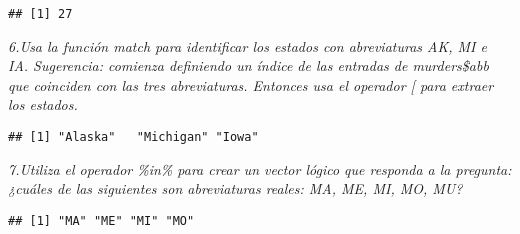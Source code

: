 \documentclass[
]{article}
\newenvironment{Shaded}{\begin{snugshade}}{\end{snugshade}}
\newcommand{\CommentTok}[1]{\textcolor[rgb]{0.56,0.35,0.01}{\textit{#1}}}
\newcommand{\FunctionTok}[1]{\textcolor[rgb]{0.00,0.00,0.00}{#1}}
\newcommand{\NormalTok}[1]{#1}
\newcommand{\OtherTok}[1]{\textcolor[rgb]{0.56,0.35,0.01}{#1}}
\newcommand{\SpecialCharTok}[1]{\textcolor[rgb]{0.00,0.00,0.00}{#1}}
\newcommand{\StringTok}[1]{\textcolor[rgb]{0.31,0.60,0.02}{#1}}
\begin{document}
\begin{verbatim}
## [1] 27
\end{verbatim}

\emph{6.Usa la función match para identificar los estados con
abreviaturas AK, MI e IA. Sugerencia: comienza definiendo un índice de
las entradas de murders\$abb que coinciden con las tres abreviaturas.
Entonces usa el operador {[} para extraer los estados.}

\begin{Shaded}
\end{Shaded}

\begin{verbatim}
## [1] "Alaska"   "Michigan" "Iowa"
\end{verbatim}

\emph{7.Utiliza el operador \%in\% para crear un vector lógico que
responda a la pregunta: ¿cuáles de las siguientes son abreviaturas
reales: MA, ME, MI, MO, MU?}

\begin{Shaded}
\end{Shaded}

\begin{verbatim}
## [1] "MA" "ME" "MI" "MO"
\end{verbatim}

\begin{Shaded}
\end{Shaded}
\end{document}
